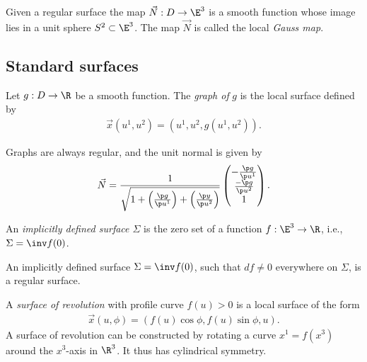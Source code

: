 \documentclass{article}
\begin{document}
\begin{proposition}
    Given a regular surface the map $\vec N:D\to\E^3$ is a smooth function whose
    image lies in a unit sphere $S^2\subset\E^3$. The map $\vec N$ is called the
    local \emph{Gauss map}.
\end{proposition}

\subsection{Standard surfaces}

\begin{definition}
    Let $g:D\to\R$ be a smooth function. The \emph{graph of} $g$ is the local surface 
    defined by 
    \begin{align*}
        \vec x(u^1, u^2) = (u^1, u^2, g(u^1, u^2)).
    \end{align*}
\end{definition}

\begin{proposition}
    Graphs are always regular, and the unit normal is given by
    \begin{align*}
        \vec N = \frac{1}{\sqrt{1 + \left(\frac{\p g}{\p u^1}\right) + \left(\frac{\p y}{\p u^2}\right)}}\begin{pmatrix}
            -\frac{\p g}{\p u^1} \\ \frac{-\p g}{\p u^2} \\ 1
        \end{pmatrix}.
    \end{align*}
\end{proposition}

\begin{definition}
    An \emph{implicitly defined surface $\Sigma$} is the zero set of a function
    $f:\E^3\to\R$, i.e., $\Sigma=\inv f(0)$.
\end{definition}

\begin{proposition}
    An implicitly defined surface $\Sigma = \inv f(0)$, such that $df\not=0$
    everywhere on $\Sigma$, is a regular surface.
\end{proposition}

\begin{definition}
    A \emph{surface of revolution} with profile curve $f(u)>0$ is a local 
    surface of the form 
    \begin{align*}
        \vec x(u, \phi) = (f(u)\cos\phi,f(u)\sin\phi,u).
    \end{align*}
    A surface of revolution can be constructed by rotating a curve $x^1=f(x^3)$
    around the $x^3$-axis in $\R^3$. It thus has cylindrical symmetry.
\end{definition}
\end{document}
